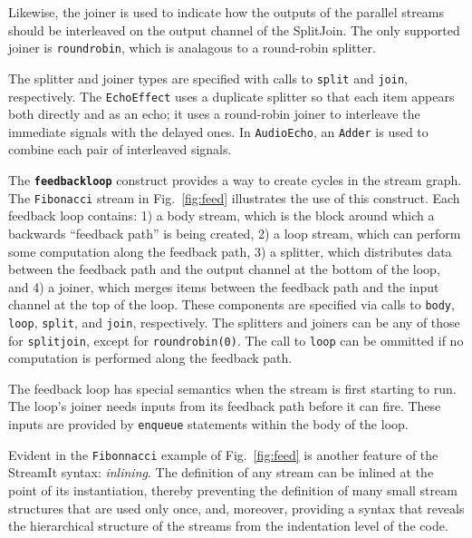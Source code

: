 Likewise, the joiner is used to indicate how the outputs of the parallel
streams should be interleaved on the output channel of the SplitJoin.
The only supported joiner is \texttt{roundrobin}, which is analagous
to a round-robin splitter.

The splitter and joiner types are specified with calls to
\texttt{split} and \texttt{join}, respectively.  The
\texttt{EchoEffect} uses a duplicate splitter so that each item
appears both directly and as an echo; it uses a round-robin joiner to
interleave the immediate signals with the delayed ones.  In
\texttt{AudioEcho}, an \texttt{Adder} is used to combine each pair of
interleaved signals.

The \textbf{\texttt{feedbackloop}} construct provides a way to create
cycles in the stream graph.  The \texttt{Fibonacci} stream in
Fig.~\ref{fig:feed} illustrates the use of this construct.  Each
feedback loop contains: 1) a body stream, which is the block around
which a backwards ``feedback path'' is being created, 2) a loop
stream, which can perform some computation along the feedback path, 3)
a splitter, which distributes data between the feedback path and the
output channel at the bottom of the loop, and 4) a joiner, which
merges items between the feedback path and the input channel at the
top of the loop.  These components are specified via calls to
\texttt{body}, \texttt{loop}, \texttt{split}, and \texttt{join},
respectively.
%
%
The splitters and joiners can be any of those for \texttt{splitjoin},
except for \texttt{roundrobin(0)}.  The call to \texttt{loop} can be
ommitted if no computation is performed along the feedback path.

The feedback loop has special semantics when the stream is first
starting to run.  The loop's joiner needs inputs from its feedback
path before it can fire.  These inputs are provided by
\texttt{enqueue} statements within the body of the loop.

Evident in the \texttt{Fibonnacci} example of Fig.~\ref{fig:feed} is
another feature of the StreamIt syntax: \emph{inlining}.  The
definition of any stream can be inlined at the point of its
instantiation, thereby preventing the definition of many small stream
structures that are used only once, and, moreover, providing a syntax
that reveals the hierarchical structure of the streams from the
indentation level of the code.

